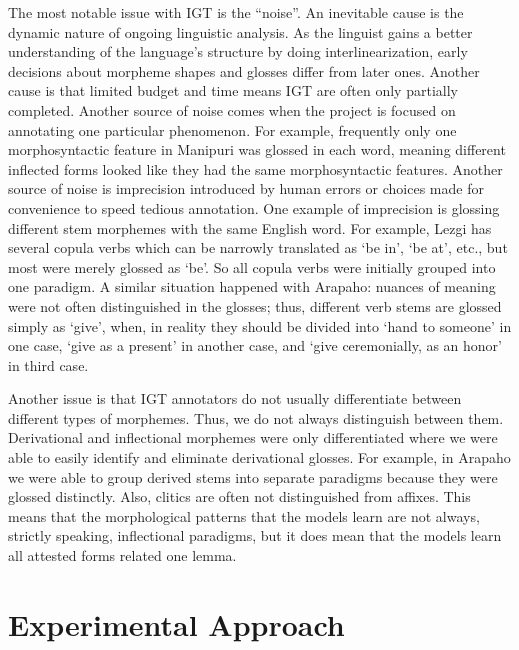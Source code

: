 The most notable issue with IGT is the ``noise''. An inevitable cause is the dynamic nature of ongoing linguistic analysis. As the linguist gains a better understanding of the language's structure by doing interlinearization, early decisions about morpheme shapes and glosses differ from later ones. Another cause is that limited budget and time means IGT are often only partially completed. Another source of noise comes when the project is focused on annotating one particular phenomenon. For example, frequently only one morphosyntactic feature in Manipuri was glossed in each word, meaning different inflected forms looked like they had the same morphosyntactic features. Another source of noise is imprecision introduced by human errors or choices made for convenience to speed tedious annotation. One example of imprecision is glossing different stem morphemes with the same English word. For example, Lezgi has several copula verbs which can be narrowly translated as `be in', `be at', etc., but most were merely glossed as `be'. So all copula verbs were initially grouped into one paradigm. A similar situation happened with Arapaho: nuances of meaning were not often distinguished in the glosses; thus, different verb stems are glossed simply as ‘give’, when, in reality they should be divided into ‘hand to someone’ in one case, ‘give as a present’ in another case, and ‘give ceremonially, as an honor’ in third case.

Another issue is that IGT annotators do not usually differentiate between different types of morphemes. Thus, we do not always distinguish between them. Derivational and inflectional morphemes were only differentiated where we were able to easily identify and eliminate derivational glosses. For example, in Arapaho we were able to group derived stems into separate paradigms because they were glossed distinctly. Also, clitics are often not distinguished from affixes. This means that the morphological patterns that the models learn are not always, strictly speaking, inflectional paradigms, but it does mean that the models learn all attested forms related one lemma.


\section{Experimental Approach}

